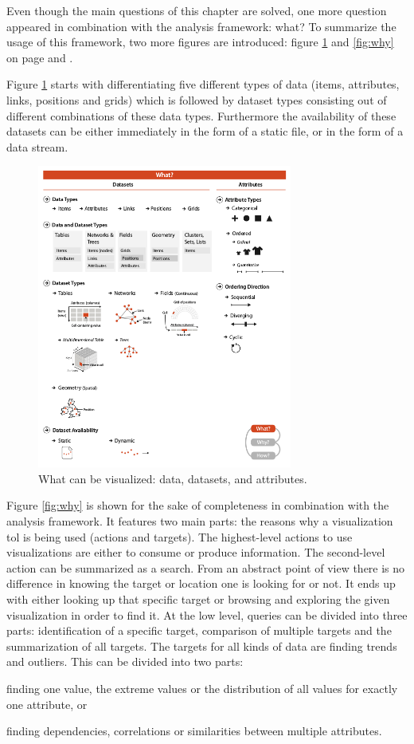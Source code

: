Even though the main questions of this chapter are solved, one more question appeared in combination with the analysis framework: what? To summarize the usage of this framework, two more figures are introduced: figure \ref{fig:what} and \ref{fig:why} on page \pageref{fig:what} and \pageref{fig:why}.

Figure \ref{fig:what} starts with differentiating five different types of data (items, attributes, links, positions and grids) which is followed by dataset types consisting out of different combinations of these data types. Furthermore the availability of these datasets can be either immediately in the form of a static file, or in the form of a data stream.

\begin{figure}[!htb]
\centering
\includegraphics[height=10cm,keepaspectratio]{images/basics/what.png}
\caption[
    What can be visualized: data, datasets, and attributes .
]{What can be visualized: data, datasets, and attributes.}
\label{fig:what}
\end{figure}

Figure \ref{fig:why} is shown for the sake of completeness in combination with the analysis framework. It features two main parts: the reasons why a visualization tol is being used (actions and targets). The highest-level actions to use visualizations are either to consume or produce information. The second-level action can be summarized as a search. From an abstract point of view there is no difference in knowing the target or location one is looking for or not. It ends up with either looking up that specific target or browsing and exploring the given visualization in order to find it. At the low level, queries can be divided into three parts: identification of a specific target, comparison of multiple targets and the summarization of all targets.
The targets for all kinds of data are finding trends and outliers. This can be divided into two parts:
\begin{enumerate*}
\item finding one value, the extreme values or the distribution of all values for exactly one attribute, or
\item finding dependencies, correlations or similarities between multiple attributes.
\end{enumerate*}

